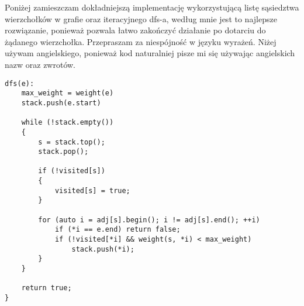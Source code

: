 \documentclass[a4paper,10pt]{article}
\begin{document}
Poniżej zamieszczam dokładniejszą implementację wykorzystującą listę sąsiedztwa wierzchołków w grafie 
oraz iteracyjnego dfs-a, według mnie jest to najlepsze rozwiązanie, ponieważ pozwala łatwo zakończyć działanie 
po dotarciu do żądanego wierzchołka.\newline
Przepraszam za niespójność w języku wyrażeń. Niżej używam angielskiego, ponieważ kod naturalniej pisze mi się używając angielskich nazw oraz zwrotów.
\newpage
\begin{lstlisting}
dfs(e):
    max_weight = weight(e)
    stack.push(e.start)
	
    while (!stack.empty())
    {
        s = stack.top();
        stack.pop();
		
        if (!visited[s])
        {
            visited[s] = true;
        }
		
        for (auto i = adj[s].begin(); i != adj[s].end(); ++i) 
            if (*i == e.end) return false;
            if (!visited[*i] && weight(s, *i) < max_weight)
                stack.push(*i);
        }
    }

    return true;
}
	

\end{lstlisting}
\end{document}
